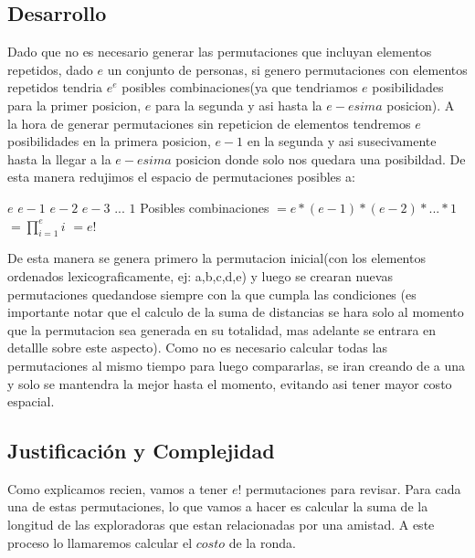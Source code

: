 \subsection{Desarrollo}
Dado que no es necesario generar las permutaciones que incluyan elementos repetidos, dado $e$ un conjunto de personas, si genero permutaciones con elementos repetidos tendria $e^e$ posibles combinaciones(ya que tendriamos $e$ posibilidades para la primer posicion, $e$ para la segunda y asi hasta la $e-esima$ posicion). A la hora de generar permutaciones sin repeticion de elementos tendremos $e$ posibilidades en la primera posicion, $e-1$ en la segunda y asi susecivamente hasta la llegar a la $e-esima$ posicion donde solo nos quedara una posibildad. De esta manera redujimos el espacio de permutaciones posibles a:
\newline

\begin{center}
    \underline{$e$}
    \underline{$e-1$}
    \underline{$e-2$}
    \underline{$e-3$}
    \underline{$. . .$}
    \underline{$1$} \newline
    Posibles combinaciones \newline \newline
    $= e * (e - 1) * (e - 2) * ... * 1$ \newline \newline
    $= \prod_{i = 1}^e i$ \newline \newline
    $= e!$ \newline
\end{center}
 
De esta manera se genera primero la permutacion inicial(con los elementos ordenados lexicograficamente, ej: a,b,c,d,e) y luego se crearan nuevas permutaciones quedandose siempre con la que cumpla las condiciones (es importante notar que el calculo de la suma de distancias se hara solo al momento que la permutacion sea generada en su totalidad, mas adelante se entrara en detallle sobre este aspecto). Como no es necesario calcular todas las permutaciones al mismo tiempo para luego compararlas, se iran creando de a una y solo se mantendra la mejor hasta el momento, evitando asi tener mayor costo espacial.

\subsection{Justificaci\'on y Complejidad}
Como explicamos recien, vamos a tener $e!$ permutaciones para revisar. Para cada una de estas permutaciones, lo que vamos a hacer es calcular la suma de la longitud de las exploradoras que estan relacionadas por una amistad. A este proceso lo llamaremos calcular el $costo$ de la ronda.\par

